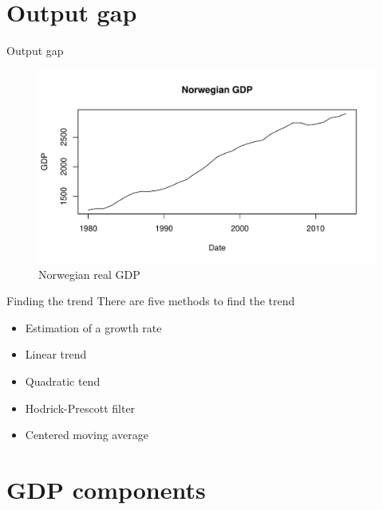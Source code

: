\documentclass[14pt,xcolor=pdftex,dvipsnames,table]{beamer}\usepackage[]{graphicx}\usepackage[]{color}
\makeatletter
\def\maxwidth{ %
  \ifdim\Gin@nat@width>\linewidth
    \linewidth
  \else
    \Gin@nat@width
  \fi
}
\newenvironment{knitrout}{}{} %
\makeatother
\begin{document}
\section{Output gap}
\begin{frame}{Output gap}
\begin{knitrout}
\color{fgcolor}\begin{figure}[]

\includegraphics[width=\maxwidth]{figure/GDP-1} \caption[Norwegian real GDP]{Norwegian real GDP\label{fig:GDP}}
\end{figure}


\end{knitrout}
\end{frame}

\begin{frame}{Finding the trend}
There are five methods to find the trend
\pause
\begin{itemize}[<+-| alert@+>]
\item Estimation of a growth rate 
\item Linear trend
\item Quadratic tend
\item Hodrick-Prescott filter
\item Centered moving average
\end{itemize}
\end{frame}


\section{GDP components}
\end{document}
